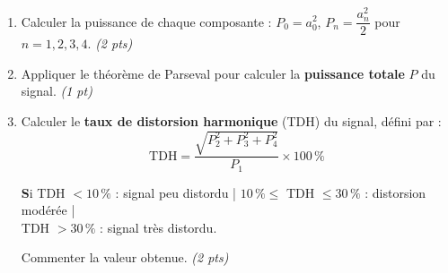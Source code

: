 \documentclass[a4paper,11pt]{article}
\begin{document}
\begin{enumerate}[label=\textbf{\arabic*.}]
  \item Calculer la puissance de chaque composante :
        $P_0 = a_0^2$, \; $P_n = \dfrac{a_n^2}{2}$ pour $n = 1, 2, 3, 4$.
        \hfill \textit{(2 pts)}
  \begin{tcolorbox}[reponsebox, height=3.5cm]\end{tcolorbox}

  \item Appliquer le théorème de Parseval pour calculer la \textbf{puissance totale} $P$ du signal.
        \hfill \textit{(1 pt)}
  \begin{tcolorbox}[reponsebox, height=2cm]\end{tcolorbox}

  \item Calculer le \textbf{taux de distorsion harmonique} (TDH) du signal, défini par :
        \[
          \mathrm{TDH} = \frac{\sqrt{P_2^2 + P_3^2 + P_4^2}}{P_1} \times 100\,\%
        \]
        \begin{tcolorbox}[colback=yellow!10!white, colframe=yellow!60!black,
                          sharp corners, boxrule=0.5pt,
                          left=4pt, right=4pt, top=2pt, bottom=2pt]
          \small\textbf Si TDH $< 10\,\%$ : signal peu distordu \quad|\quad
          $10\,\% \leq$ TDH $\leq 30\,\%$ : distorsion modérée \quad|\quad \\
          TDH $> 30\,\%$ : signal très distordu.
        \end{tcolorbox}
        Commenter la valeur obtenue. \hfill \textit{(2 pts)}
  \begin{tcolorbox}[reponsebox, height=3.5cm]\end{tcolorbox}

\end{enumerate}
\end{document}
